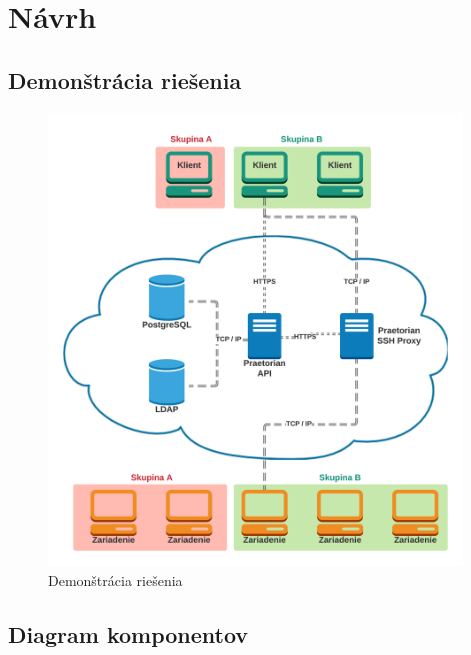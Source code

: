 \chapter{Návrh}\label{ch:návrh}

\section{Demonštrácia riešenia}\label{sec:demonstracia-riesenia}

\begin{figure}[H]
\begin{center}\includegraphics[width=\textwidth,height=12cm,keepaspectratio=true]{assets/demonstracia_riesenia.png}\end{center}
\caption[Demonštrácia riešenia]{Demonštrácia riešenia}\label{fig:obr_8}
\end{figure}

\section{Diagram komponentov}\label{sec:diagram-komponentov}

